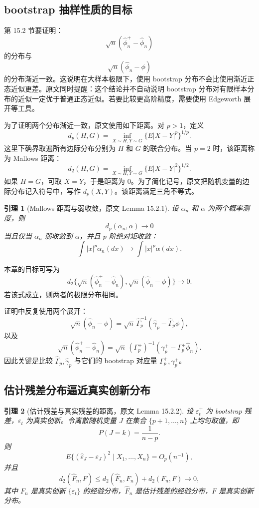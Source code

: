 \documentclass[11pt,a4paper]{ctexart}
\newtheorem{lemma}{引理}[section]
\begin{document}
\subsection{bootstrap 抽样性质的目标}

第 15.2 节要证明：
\[
  \sqrt n(\hat\phi_n^+-\hat\phi_n)
\]
的分布与
\[
  \sqrt n(\hat\phi_n-\phi)
\]
的分布渐近一致。这说明在大样本极限下，使用 bootstrap 分布不会比使用渐近正态近似更差。原文同时提醒：这个结论并不自动说明 bootstrap 分布对有限样本分布的近似一定优于普通正态近似。若要比较更高阶精度，需要使用 Edgeworth 展开等工具。

为了证明两个分布渐近一致，原文使用如下距离。对 \(p>1\)，定义
\[
  d_p(H,G)=\inf_{X\sim H,Y\sim G}\{E|X-Y|^p\}^{1/p}.
\]
这里下确界取遍所有边际分布分别为 \(H\) 和 \(G\) 的联合分布。当 \(p=2\) 时，该距离称为 Mallows 距离：
\[
  d_2(H,G)=\inf_{X\sim H,Y\sim G}\{E|X-Y|^2\}^{1/2}.
\]
如果 \(H=G\)，可取 \(X=Y\)，于是距离为 0。为了简化记号，原文把随机变量的边际分布记入符号中，写作 \(d_p(X,Y)\)。该距离满足三角不等式。

\begin{lemma}[Mallows 距离与弱收敛，原文 Lemma 15.2.1]
设 \(\alpha_n\) 和 \(\alpha\) 为两个概率测度，则
\[
  d_p(\alpha_n,\alpha)\to0
\]
当且仅当 \(\alpha_n\) 弱收敛到 \(\alpha\)，并且 \(p\) 阶绝对矩收敛：
\[
  \int |x|^p\alpha_n(dx)\to \int |x|^p\alpha(dx).
\]
\end{lemma}

本章的目标可写为
\[
  d_2\{\sqrt n(\hat\phi_n^+-\hat\phi_n),
      \sqrt n(\hat\phi_n-\phi)\}\to0.
\]
若该式成立，则两者的极限分布相同。

证明中反复使用两个展开：
\[
  \sqrt n(\hat\phi_n-\phi)
  =\sqrt n\,\hat\Gamma_p^{-1}(\hat\gamma_p-\hat\Gamma_p\phi),
\]
以及
\[
  \sqrt n(\hat\phi_n^+-\hat\phi_n)
  =\sqrt n\,(\Gamma_p^+)^{-1}(\gamma_p^+-\Gamma_p^+\hat\phi_n).
\]
因此关键是比较 \(\hat\Gamma_p,\hat\gamma_p\) 与它们的 bootstrap 对应量 \(\Gamma_p^+,\gamma_p^+\)。

\subsection{估计残差分布逼近真实创新分布}

\begin{lemma}[估计残差与真实残差的距离，原文 Lemma 15.2.2]
设 \(\varepsilon_t^+\) 为 bootstrap 残差，\(\varepsilon_t\) 为真实创新。令离散随机变量 \(J\) 在集合 \(\{p+1,\ldots,n\}\) 上均匀取值，即
\[
  P(J=k)=\frac1{n-p}.
\]
则
\[
  E\{(\hat\varepsilon_J-\varepsilon_J)^2\mid X_1,\ldots,X_n\}
  =O_p(n^{-1}),
  \tag{15.2}
\]
并且
\[
  d_2(\hat F_n,F)
  \le d_2(\hat F_n,F_n)+d_2(F_n,F)\to0,
  \tag{15.3}
\]
其中 \(F_n\) 是真实创新 \(\{\varepsilon_t\}\) 的经验分布，\(\hat F_n\) 是估计残差的经验分布，\(F\) 是真实创新分布。
\end{lemma}
\end{document}
